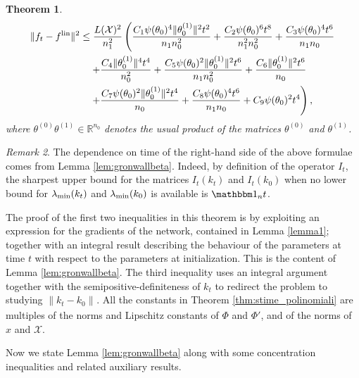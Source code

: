 \documentclass{article}
\newtheorem{thm}{Theorem}[section]
\theoremstyle{definition}
\theoremstyle{remark}
\newtheorem{rem}[thm]{Remark}
\numberwithin{equation}{section}
\newcommand{\X}{\mathcal{X}}
\newcommand{\R}{\mathbb{R}}
\newcommand{\s}{\psi}
\newcommand{\lin}{{\textup{lin}}}
\newcommand{\lammin}{\lambda_{\textup{min}}}
\newcommand{\norm}[2]{
    \|#1\|_{#2}
}
\begin{document}
\begin{thm}
\begin{align}
        \norm{f_t- f^\lin}{}^2 &\le \frac{L(\X)^2}{n_1^2}\left(\frac{C_1 \s(\theta_0)^4\norm{\theta^{(1)}_0}{}^2t^2}{n_1n_0^2}+\frac{C_2 \s(\theta_0)^6t^8}{n_1^2n_0^2}+\frac{C_3 \s(\theta_0)^4t^6}{n_1n_0}\right. \\
    &\left.\quad +\frac{C_4 \norm{\theta^{(1)}_0}{}^4t^4}{n_0^2}+\frac{C_5 \s(\theta_0)^2\norm{\theta^{(1)}_0}{}^2t^6}{n_1n_0^2}+\frac{C_6 \norm{\theta^{(1)}_0}{}^2t^6}{n_0}\right.\\
    &\left.\quad +\frac{C_7 \s(\theta_0)^2\norm{\theta^{(1)}_0}{}^2t^4}{n_0}+\frac{C_8 \s(\theta_0)^4t^6}{n_1n_0}+C_9\s(\theta_0)^2t^4\right),
\end{align}
where $\theta^{(0)}\theta^{(1)} \in \R^{n_0}$ denotes the usual product of the matrices $\theta^{(0)}$ and $\theta^{(1)}$.
\end{thm}
\begin{rem}
    The dependence on time of the right-hand side of the above formulae comes from Lemma \ref{lem:gronwallbeta}.
    Indeed, by definition of the operator $I_t$, the sharpest upper bound for the matrices $I_t(k_t)$ and $I_t(k_0)$ when no lower bound for $\lammin(k_t)$ and $\lammin(k_0)$ is available is $\mathbbm 1_n t$.
\end{rem}
The proof of the first two inequalities in this theorem is by exploiting an expression for the gradients of the network, contained in Lemma \ref{lemma1};
together with an integral result describing the behaviour of the parameters at time $t$ with respect to the parameters at initialization.
This is the content of Lemma \ref{lem:gronwallbeta}.
The third inequality uses an integral argument together with the semipositive-definiteness of $k_t$ to redirect the problem to studying $\norm{k_t-k_0}{}$.
All the constants in Theorem \ref{thm:stime_polinomiali} are multiples of the norms and Lipschitz constants of $\Phi$ and $\Phi'$, and of the norms of $x$ and $\X$.

Now we state Lemma \ref{lem:gronwallbeta} along with some concentration inequalities and related auxiliary results.
\end{document}
